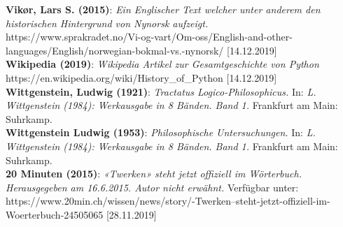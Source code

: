 \documentclass[10pt,a4paper]{article}
\begin{document}
\textbf{Vikør, Lars S. (2015)}: \textit{Ein Englischer Text welcher unter anderem den historischen Hintergrund von Nynorsk aufzeigt.} \\ https://www.sprakradet.no/Vi-og-vart/Om-oss/English-and-other-languages/English/norwegian-bokmal-vs.-nynorsk/ [14.12.2019] \\
\textbf{Wikipedia (2019)}: \textit{Wikipedia Artikel zur Gesamtgeschichte von Python} \\
https://en.wikipedia.org/wiki/History\_of\_Python [14.12.2019] \\
\textbf{Wittgenstein, Ludwig (1921)}: \textit{Tractatus Logico-Philosophicus.} In: \textit{L. Wittgenstein (1984): Werkausgabe in 8 Bänden. Band 1.} Frankfurt am Main: Suhrkamp. \\
\textbf{Wittgenstein Ludwig (1953)}: \textit{Philosophische Untersuchungen.} In: \textit{L. Wittgenstein (1984): Werkausgabe in 8 Bänden. Band 1.} Frankfurt am Main: Suhrkamp. \\
\textbf{20 Minuten (2015)}: \textit{«Twerken» steht jetzt offiziell im Wörterbuch. Herausgegeben am 16.6.2015. Autor nicht erwähnt.} Verfügbar unter: \\ https://www.20min.ch/wissen/news/story/-Twerken--steht-jetzt-offiziell-im-Woerterbuch-24505065  [28.11.2019] \\
\end{document}
